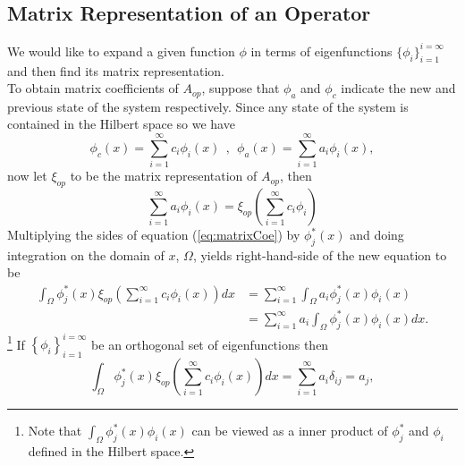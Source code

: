 \documentclass[12pt, letterpaper]{article}
\begin{document}
\subsection{Matrix Representation of an Operator}
\label{subsec:2}
We would like to expand a given function $\phi$ in terms of eigenfunctions $\{\phi_{i}\}_{i=1}^{i=\infty}$  and then find its matrix representation. \\
To obtain matrix coefficients of $A_{op}$, suppose that $\phi_{a}$ and $\phi_{c}$ indicate the new and previous state of the system respectively. Since any state of the system is contained in the Hilbert space so we have
\begin{equation}
    \phi_{c}(x)=\sum_{i=1}^{\infty}c_{i}\phi_{i}(x)\:\:,\:\:\phi_{a}(x)=\sum_{i=1}^{\infty}a_{i}\phi_{i}(x),
\end{equation}
now let $\xi_{op}$ to be the matrix representation of $A_{op}$, then 
\begin{equation}
\label{eq:matrixCoe}
\sum_{i=1}^{\infty}a_{i}\phi_{i}(x)= \xi_{op}(\sum_{i=1}^{\infty}c_{i}\phi_{i})
\end{equation}
Multiplying the sides of equation (\ref{eq:matrixCoe}) by $\phi_{j}^{*}(x)$ and doing integration on the domain of $x$, $\Omega$, yields right-hand-side of the new equation to be
\begin{align*}
\label{}
    \int_{\Omega}\phi_{j}^{*}(x)\xi_{op}(\sum_{i=1}^{\infty}c_{i}\phi_{i}(x))dx &=\sum_{i=1}^{\infty}\int_{\Omega}a_{i}\phi_{j}^{*}(x)\phi_{i}(x)\\&= \sum_{i=1}^{\infty}a_{i}\int_{\Omega}\phi_{j}^{*}(x)\phi_{i}(x) dx.
\end{align*}
\footnote{Note that $\int_{\Omega}\phi_{j}^{*}(x)\phi_{i}(x)$ can be viewed as a inner product of $\phi_{j}^{*}$ and $\phi_{i}$ defined in the Hilbert space.}
If $\left\{\phi_{i}\right\}_{i=1}^{i=\infty}$ be an orthogonal set of eigenfunctions then  
\begin{equation}
 \int_{\Omega}\phi_{j}^{*}(x)\xi_{op}(\sum_{i=1}^{\infty}c_{i}\phi_{i}(x))dx= \sum_{i=1}^{\infty}a_{i}\delta_{ij}= a_{j},
\end{equation}
\end{document}
